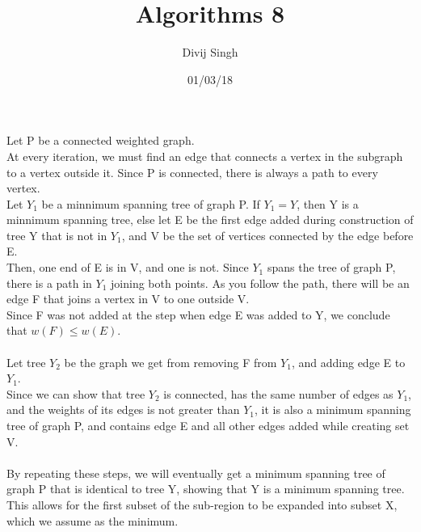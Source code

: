\documentclass{article}
\title{Algorithms 8}
\author{Divij Singh}
\date{01/03/18}
\begin{document}
	\maketitle
	
	\section{}
	Let P be a connected weighted graph. \\
	At every iteration, we must find an edge that connects a vertex in the subgraph to a vertex outside it. Since P is connected, there is always a path to every vertex.\\
	Let $Y_1$ be a minnimum spanning tree of graph P. If $Y_1=Y$, then Y is a minnimum spanning tree, else let E be the first edge added during construction of tree Y that is not in $Y_1$, and V be the set of vertices connected by the edge before E.\\
	Then, one end of E is in V, and one is not. Since $Y_1$ spans the tree of graph P, there is a path in $Y_1$ joining both points. As you follow the path, there will be an edge F that joins a vertex in V to one outside V.\\
	Since F was not added at the step when edge E was added to Y, we conclude that $w(F) \le w(E)$.\\
	\\
	Let tree $Y_2$ be the graph we get from removing F from $Y_1$, and adding edge E to $Y_1$.\\
	Since we can show that tree $Y_2$ is connected, has the same number of edges as $Y_1$, and the weights of its edges is not greater than $Y_1$, it is also a minimum spanning tree of graph P, and contains edge E and all other edges added while creating set V.\\
	\\By repeating these steps, we will eventually get a minimum spanning tree of graph P that is identical to tree Y, showing that Y is a minimum spanning tree.\\
	This allows for the first subset of the sub-region to be expanded into subset X, which we assume as the minimum.
	
\end{document}
